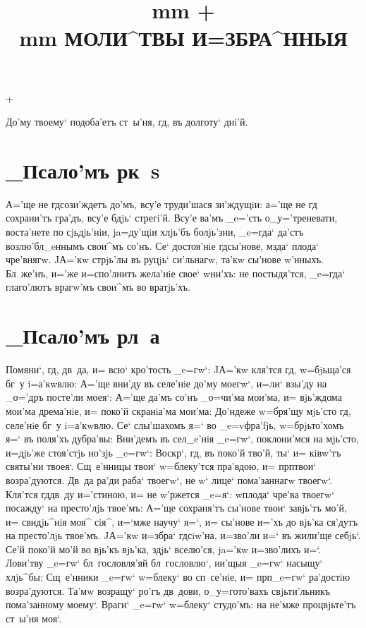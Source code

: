 \documentclass[12pt,twoside,xdvi,a6paper,civil=times]{hipbook}
\title{
\vskip -30 mm
{\izhverylarge +} %
      \\
\vskip 15 mm
\large\MakeUppercase{Моли^твы и=збра^нныя}\\ 
\vskip -70mm}
\renewcommand{\*}{\raise3pt\hbox{\footnotesize*}}
\begin{document}
\maketitle

\newpage
\thispagestyle{empty} 
\phantom{abc}\baselineskip 
\begin{center}
  {\Huge+\par} 
  \baselineskip 
До'му твоему` подоба'етъ ст~ы'ня, гд, въ долготу` днi'й.
\end{center}
\newpage


\hdrcrosspage

\section{_Псало'мъ рк~s}

А='ще не гд сози'ждетъ до'мъ, всу'е тру\-ди'\-ша\-ся зи'ждущiи: а='ще не гд
со\-хра\-ни'тъ гра'дъ, всу'е бдjь` стрегi'й. Всу'е ва'мъ _e='сть о_у='треневати,
воста'нете по сjь\-дjь'\-нiи, ja=ду'щiи хлjь'бъ болjь'зни, _e=гда` да'стъ
воз\-лю'б\-л_eн\-нымъ свои^мъ со'нъ. Се` достоя'нiе гд сы'нове, мзда` плода`
чре'внягw. JА='кw стрjь'лы въ руцjь` си'льнагw, та'кw сы'нове w'нныхъ.
Бл~же'нъ, и='же и=спо'лнитъ же\-ла'\-нiе свое` w\т ни'хъ: не постыдя'тся, _e=гда`
глаго'лютъ врагw'мъ свои^мъ во вратjь'хъ.

\section{_Псало'мъ рл~а}

Помяни`, гд, дв~да, и= всю` кро'тость _e=гw`: JА='кw кля'тся гд,
w=бjьща'ся бг~у i=а'\-кwв\-лю: А='ще вни'ду въ селе'нiе до'му моегw`, и=ли`
взы'ду на _о='дръ посте'ли моея`: А='ще да'мъ со'нъ _о=чи'ма мои'ма, и=
вjь'ждома мои'ма дрема'нiе, и= поко'й скранiа'ма мои'ма: До'ндеже w=бря'щу
мjь'сто гд, селе'нiе бг~у i=а'кwвлю. Се` слы'шахомъ я=` во _e=vфра'fjь,
w=брjьто'хомъ я=` въ поля'хъ дубра'вы: Вни'демъ въ сел_e'нiя _e=гw`,
поклони'мся на мjь'сто, и=дjь'же стоя'стjь но'зjь _e=гw`: Воскр`, гд,
въ поко'й тво'й, ты` и= кiвw'тъ святы'ни твоея`. Сщ~е'нницы твои` w=блеку'тся
пра'вдою, и= прп твои` возра'дуются. Дв~да ра'ди раба` твоегw`, не
w` лице` пома'заннагw твоегw`. Кля'тся гд дв~ду и='стиною, и= не
w'ржется _e=я`: w\т плода` чре'ва твоегw` посажду` на пре\-сто'\-лjь твое'мъ:
А='ще сохраня'тъ сы'нове твои` за\-вjь'тъ мо'й, и= свидjь^нiя моя^ сiя^,
и=`мже научу` я=`, и= сы'нове и='хъ до вjь'ка ся'дутъ на престо'лjь твое'мъ.
JА='кw и=збра` гд сiw'на, и=зво'ли и=` въ жили'ще себjь`. Се'й поко'й мо'й
во вjь'къ вjь'ка, здjь` вселю'ся, ja='кw и=зво'лихъ и=`. Лови'тву _e=гw`
бл~гословля'яй бл~гословлю`, ни'щыя _e=гw` насыщу` хлjь^бы: Сщ~е'нники _e=гw`
w=блеку` во сп~се'нiе, и= прп _e=гw` ра'достiю возра'дуются. Та'мw
возращу` ро'гъ дв~дови, о_у=гото'вахъ свjьти'льникъ пома'занному моему`.
Враги` _e=гw` w=блеку` студо'мъ: на не'мже процвjьте'тъ ст~ы'ня моя`.
\end{document}

